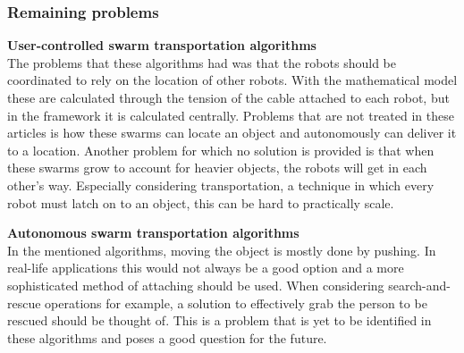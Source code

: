 \subsubsection{Remaining problems}

\textbf{User-controlled swarm transportation algorithms}\\
The problems that these algorithms had was that the robots should be coordinated to rely on the location of other robots.
With the mathematical model these are calculated through the tension of the cable attached to each robot, but in the framework it is calculated centrally. 
Problems that are not treated in these articles is how these swarms can locate an object and autonomously can deliver it to a location. 
Another problem for which no solution is provided is that when these swarms grow to account for heavier objects, the robots will get in each other's way. 
Especially considering transportation, a technique in which every robot must latch on to an object, this can be hard to practically scale. 

\textbf{Autonomous swarm transportation algorithms}\\
In the mentioned algorithms, moving the object is mostly done by pushing. In real-life applications this would not always be a good option and a more sophisticated method of attaching should be used. When considering search-and-rescue operations for example, a solution to effectively grab the person to be rescued should be thought of. This is a problem that is yet to be identified in these algorithms and poses a good question for the future.














